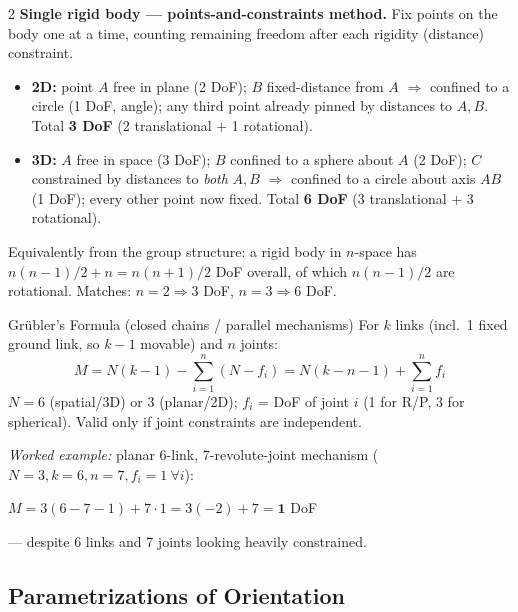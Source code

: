 \documentclass[10pt,a4paper]{article}
\begin{document}
\begin{multicols}{2}
\textbf{Single rigid body --- points-and-constraints method.} Fix points on the body one at a time, counting remaining freedom after each rigidity (distance) constraint.
\begin{itemize}
\item \textbf{2D:} point $A$ free in plane (2 DoF); $B$ fixed-distance from $A$ $\Rightarrow$ confined to a circle (1 DoF, angle); any third point already pinned by distances to $A,B$. Total \textbf{3 DoF} (2 translational $+$ 1 rotational).
\item \textbf{3D:} $A$ free in space (3 DoF); $B$ confined to a sphere about $A$ (2 DoF); $C$ constrained by distances to \emph{both} $A,B$ $\Rightarrow$ confined to a circle about axis $AB$ (1 DoF); every other point now fixed. Total \textbf{6 DoF} (3 translational $+$ 3 rotational).
\end{itemize}
Equivalently from the group structure: a rigid body in $n$-space has $n(n-1)/2+n=n(n+1)/2$ DoF overall, of which $n(n-1)/2$ are rotational. Matches: $n=2\Rightarrow 3$ DoF, $n=3\Rightarrow 6$ DoF.

\begin{defbox}{Grübler's Formula (closed chains / parallel mechanisms)}
For $k$ links (incl.\ 1 fixed ground link, so $k-1$ movable) and $n$ joints:
\[
M = N(k-1) - \sum_{i=1}^{n} (N-f_i) = N(k-n-1) + \sum_{i=1}^{n} f_i
\]
$N=6$ (spatial/3D) or $3$ (planar/2D); $f_i$ = DoF of joint $i$ (1 for R/P, 3 for spherical). Valid only if joint constraints are independent.
\end{defbox}
\textit{Worked example:} planar 6-link, 7-revolute-joint mechanism ($N=3,k=6,n=7,f_i=1\ \forall i$):

$M=3(6-7-1)+7\cdot1=3(-2)+7=\mathbf{1}$ DoF

--- despite 6 links and 7 joints looking heavily constrained.

\subsection{Parametrizations of Orientation}


\end{multicols}
\end{document}
